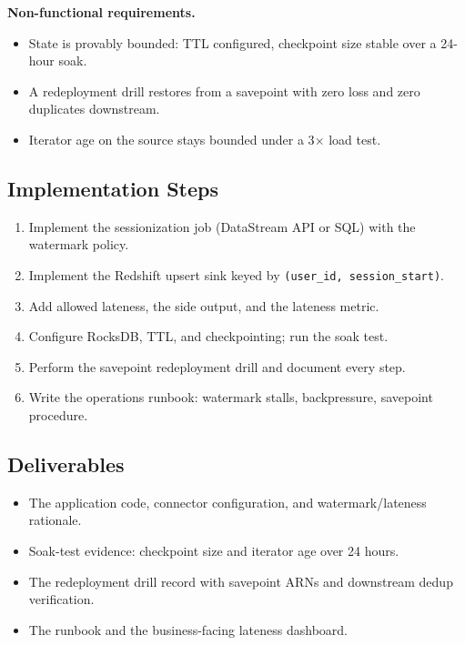 \textbf{Non-functional requirements.}
\begin{itemize}
    \item State is provably bounded: TTL configured, checkpoint size stable over a 24-hour soak.
    \item A redeployment drill restores from a savepoint with zero loss and zero duplicates downstream.
    \item Iterator age on the source stays bounded under a 3$\times$ load test.
\end{itemize}

\subsection*{Implementation Steps}
\begin{enumerate}
    \item Implement the sessionization job (DataStream API or SQL) with the watermark policy.
    \item Implement the Redshift upsert sink keyed by \texttt{(user\_id, session\_start)}.
    \item Add allowed lateness, the side output, and the lateness metric.
    \item Configure RocksDB, TTL, and checkpointing; run the soak test.
    \item Perform the savepoint redeployment drill and document every step.
    \item Write the operations runbook: watermark stalls, backpressure, savepoint procedure.
\end{enumerate}

\subsection*{Deliverables}
\begin{itemize}
    \item The application code, connector configuration, and watermark/lateness rationale.
    \item Soak-test evidence: checkpoint size and iterator age over 24 hours.
    \item The redeployment drill record with savepoint ARNs and downstream dedup verification.
    \item The runbook and the business-facing lateness dashboard.
\end{itemize}

